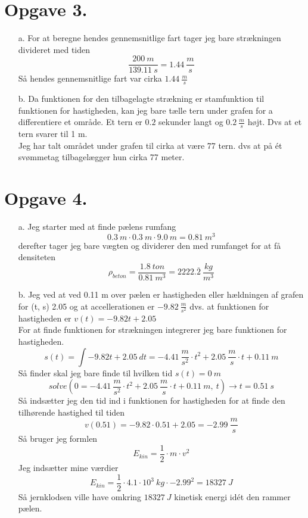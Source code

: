 \documentclass[12pt]{article}
\begin{document}
\section*{Opgave 3.}
\begin{enumerate}
  \item[a.] For at beregne hendes gennemsnitlige fart tager jeg bare strækningen divideret med tiden
  $$\frac{200 \ m}{139.11 \ s}=1.44 \ \frac{m}{s}$$
  Så hendes gennemsnitlige fart var cirka $1.44 \ \frac{m}{s}$

  \item[b.] Da funktionen for den tilbagelagte strækning er stamfunktion til funktionen for hastigheden, kan jeg bare tælle tern under grafen for a differentiere et område.
  Et tern er $0.2$ sekunder langt og $0.2 \ \frac{m}{s}$ højt. Dvs at et tern svarer til 1 m.\\
  Jeg har talt området under grafen til cirka at være 77 tern. dvs at på ét svømmetag tilbagelægger hun cirka 77 meter.
\end{enumerate}

\section*{Opgave 4.}
\begin{enumerate}
  \item[a.] Jeg starter med at finde pælens rumfang
  $$0.3 \ m \cdot 0.3 \ m \cdot 9.0 \ m=0.81 \ m^3$$
  derefter tager jeg bare vægten og dividerer den med rumfanget for at få densiteten
  $$\rho _{beton}=\frac{1.8 \ ton}{0.81 \ m^3}=2222. \overline{2} \ \frac{kg}{m^3}$$

  \item[b.] Jeg ved at ved 0.11 m over pælen er hastigheden eller hældningen af grafen for
  (t, s) 2.05 og at accellerationen er $-9.82 \ \frac{m}{s^2}$
  dvs. at funktionen for hastigheden er $v(t)=-9.82t+2.05$\\
  For at finde funktionen for strækningen integrerer jeg bare funktionen for hastigheden.
  $$s(t)=\int -9.82t+2.05 \ dt=-4.41 \ \frac{m}{s^2} \cdot t^2+2.05 \ \frac{m}{s} \cdot t+0.11 \ m$$
  Så finder skal jeg bare finde til hvilken tid $s(t)=0 \ m$
  $$solve(0=-4.41 \ \frac{m}{s^2} \cdot t^2+2.05 \ \frac{m}{s} \cdot t+0.11 \ m, \ t) \rightarrow t=0.51 \ s$$
  Så indsætter jeg den tid ind i funktionen for hastigheden for at finde den tilhørende hastighed til tiden
  $$v(0.51)=-9.82 \cdot 0.51+2.05 = -2.99 \ \frac{m}{s}$$
  Så bruger jeg formlen
  $$E_{kin}=\frac{1}{2}\cdot m\cdot v^2$$
  Jeg indsætter mine værdier
  $$E_{kin}=\frac{1}{2}\cdot 4.1 \cdot 10^3 \ kg \cdot -2.99^2=18327 \ J$$
  Så jernklodsen ville have omkring $18327 \ J$ kinetisk energi idét den rammer pælen.
\end{enumerate}
\end{document}

